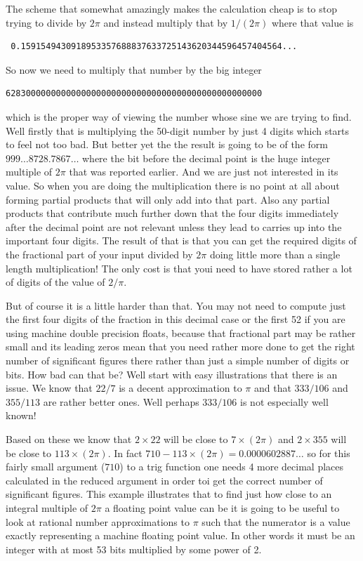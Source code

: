 The scheme that somewhat amazingly makes the calculation cheap is to
stop trying to divide by $2 \pi$ and instead multiply that by $1/(2 \pi)$
where that value is
\begin{verbatim}
 0.1591549430918953357688837633725143620344596457404564...
\end{verbatim}
So now we need to multiply that number by the big integer
\begin{verbatim}
628300000000000000000000000000000000000000000000000
\end{verbatim}
which is the proper way of viewing the number whose sine we are trying to find.
Well firstly that is multiplying the 50-digit number by just 4 digits which
starts to feel not too bad. But better yet the the result is going to
be of the form $999 \ldots 8728.7867\ldots$ where the bit before the decimal
point is the huge integer multiple of $2 \pi$ that was reported earlier. And
we are just not interested in its value. So when you are doing the
multiplication there is no point at all about forming partial products that
will only add into that part. Also any partial products that contribute
much further down that the four digits immediately after the decimal point
are not relevant unless they lead to carries up into the important
four digits. The result of that is that you can get the required digits of
the fractional part of your input divided by $2 \pi$ doing little more than
a single length multiplication! The only cost is that youi need to have
stored rather a lot of digits of the value of $2/\pi$.

But of course it is a little harder than that. You may not need to compute
just the first four digits of the fraction in this decimal case or the
first 52 if you are using machine double precision floats, because that
fractional part may be rather small and its leading zeros mean that you
need rather more done to get the right number of significant figures there
rather than just a simple number of digits or bits. How bad can that be?
Well start with easy illustrations that there is an issue. We know that $22/7$
is a decent approximation to $\pi$ and that $333/106$ and $355/113$ are
rather better ones. Well perhaps $333/106$ is not especially well known!

Based on these we know that $2 \times 22$ will be close to $7\times(2 \pi)$
and $2 \times 355$ will be close to $113 \times (2 \pi)$. In fact
$710 - 113 \times (2 \pi) = 0.0000602887\ldots$ so for this fairly
small argument ($710$) to a trig function one needs 4 more decimal places
calculated in the reduced argument in order toi get the correct number of
significant figures. This example illustrates that to find just how close
to an integral multiple of $2 \pi$ a floating point value can be it
is going to be useful to look at rational number approximations to $\pi$
such that the numerator is a value exactly representing a machine floating
point value. In other words it must be an integer with at most 53 bits
multiplied by some power of 2.

